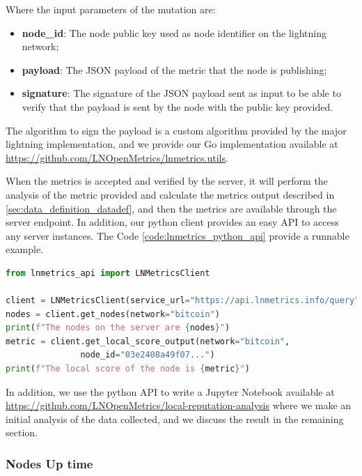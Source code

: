Where the input parameters of the mutation are:

\begin{itemize}
    \item {\bf node\_id}: The node public key used as node identifier on the lightning network;
    \item {\bf payload}: The JSON payload of the metric that the node is publishing;
    \item {\bf signature}: The signature of the JSON payload sent as input to be able to verify that the 
        payload is sent by the node with the public key provided.
\end{itemize}

The algorithm to sign the payload is a custom algorithm provided by the major
lightning implementation, and we provide our Go implementation available 
at \url{https://github.com/LNOpenMetrics/lnmetrics.utils}.

When the metrics is accepted and verified by the server, it will perform the analysis of the 
metric provided and calculate the metrics output described in \ref{sec:data_definition_datadef}, 
and then the metrics are available through the server endpoint. In addition, our python client 
provides an easy API to access any server instances. The Code \ref{code:lnmetrics_python_api}
provide a runnable example.


\begin{lstlisting}[language=python, basicstyle=\small,
                  caption={Python script to show a runnable example of our Python wrapper API usage.}, 
                  label={code:lnmetrics_python_api}]
from lnmetrics_api import LNMetricsClient

client = LNMetricsClient(service_url="https://api.lnmetrics.info/query")
nodes = client.get_nodes(network="bitcoin")
print(f"The nodes on the server are {nodes}")
metric = client.get_local_score_output(network="bitcoin", 
               node_id="03e2408a49f07...")
print(f"The local score of the node is {metric}")
\end{lstlisting}

In addition, we use the python API to write a Jupyter Notebook available at \url{https://github.com/LNOpenMetrics/local-reputation-analysis}
where we make an initial analysis of the data collected, and we discuss 
the result in the remaining section.

\subsubsection{Nodes Up time}
\label{sec:node_uptime}

